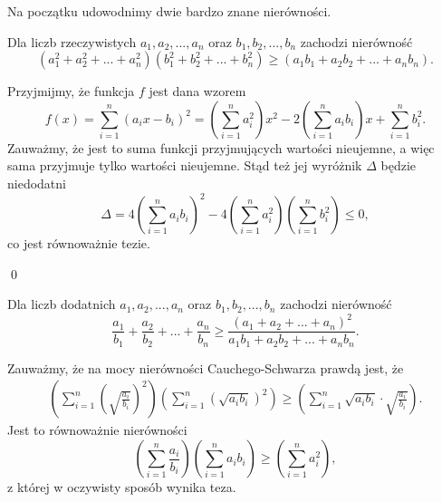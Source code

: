 

\noindent
Na początku udowodnimy dwie bardzo znane nierówności. 

\vspace{10px}


\noindent
Dla liczb rzeczywistych $a_1, a_2, ..., a_n$ oraz $b_1, b_2, ..., b_n$ zachodzi nierówność
\[
	\left(a_1^2 + a_2^2 + ... + a_n^2\right)\left(b_1^2 + b_2^2 + ... + b_n^2\right) \geqslant \left(a_1b_1 + a_2b_2 + ... + a_nb_n\right).
\]


\noindent
Przyjmijmy, że funkcja $f$ jest dana wzorem
\[
	f(x) = \sum^{n}_{i=1} (a_ix - b_i)^2 = \left(\sum^{n}_{i=1} a_i^2\right) x^2 - 2\left(\sum^{n}_{i=1} a_ib_i\right) x + \sum^{n}_{i=1} b_i^2.
\]
Zauważmy, że jest to suma funkcji przyjmujących wartości nieujemne, a więc sama przyjmuje tylko wartości nieujemne. Stąd też jej wyróżnik $\Delta$ będzie niedodatni
\[
	\Delta = 4\left(\sum^{n}_{i=1} a_ib_i\right)^2 - 4  \left(\sum^{n}_{i=1} a_i^2\right)  \left(\sum^{n}_{i=1} b_i^2\right) \leqslant 0,
\]
co jest równoważnie tezie.

\qed

\vspace{10px}



\noindent
Dla liczb dodatnich $a_1, a_2, ..., a_n$ oraz $b_1, b_2, ..., b_n$ zachodzi nierówność
\[
	\frac{a_1}{b_1} + \frac{a_2}{b_2} + ... + \frac{a_n}{b_n} \geqslant \frac{\left(a_1 + a_2 + ... + a_n\right)^2}{a_1b_1 + a_2b_2 + ... + a_nb_n}.
\]


\noindent
Zauważmy, że na mocy nierówności Cauchego-Schwarza prawdą jest, że
\begin{gather*}
	\left(\sum^{n}_{i = 1} \left(\sqrt{\frac{a_i}{b_i}}\right)^2 \right) \left(\sum^{n}_{i = 1} \left(\sqrt{a_ib_i}\right)^2 \right) \geqslant \left(\sum^{n}_{i = 1} \sqrt{a_ib_i} \cdot \sqrt{\frac{a_i}{b_i}} \right).
\end{gather*}
Jest to równoważnie nierówności
\[
	\left(\sum^{n}_{i = 1} \frac{a_i}{b_i} \right) \left(\sum^{n}_{i = 1} a_ib_i \right) \geqslant \left(\sum^{n}_{i = 1} a_i^2 \right),
\]
z której w oczywisty sposób wynika teza.

